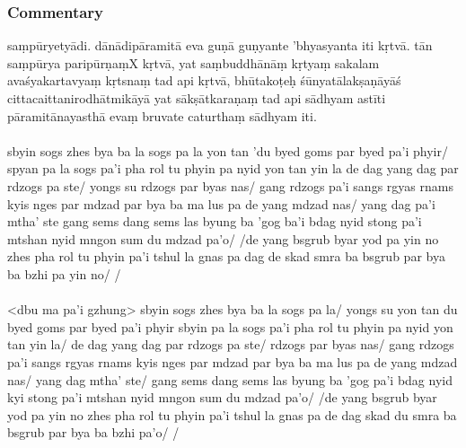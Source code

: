\documentclass[12pt]{article}
\begin{document}
\subsubsection{Commentary}
saṃpūryetyādi.
dānādipāramitā eva guṇā guṇyante 'bhyasyanta iti kṛtvā.
tān saṃpūrya paripūrṇaṃX kṛtvā, yat saṃbuddhānāṃ kṛtyaṃ sakalam\footnoteB{
	kṛtyaṃ sakalam] \conj ; sakalam \MS\ \EDD	
} avaśyakartavyaṃ kṛtsnaṃ tad api kṛtvā, bhūtakoṭeḥ śūnyatālakṣaṇāyāś cittacaitta\footnoteB{
	cittacaitta°] \EDD\ (\emd); cittacaitya° \MS
}\hspace{0em}nirodhātmikāyā yat sākṣātkaraṇaṃ tad api sādhyam astīti pāramitānayasthā evaṃ bruvate caturthaṃ sādhyam iti.\\

\textbf{\TVA}\\
sbyin sogs zhes bya ba la sogs pa la yon tan 'du byed goms par byed pa'i phyir/ spyan pa la sogs pa'i pha rol tu phyin pa nyid yon tan yin la de dag yang dag par rdzogs pa ste/ yongs su rdzogs par byas nas/ gang rdzogs pa'i sangs rgyas rnams kyis nges par mdzad par bya ba ma lus pa de yang mdzad nas/ yang dag pa'i mtha' ste gang sems dang sems las byung ba 'gog ba'i bdag nyid stong pa'i mtshan nyid mngon sum du mdzad pa'o/ /de yang bsgrub byar yod pa yin no zhes pha rol tu phyin pa'i tshul la gnas pa dag de skad smra ba bsgrub par bya ba bzhi pa yin no/ /\\

\textbf{\TVB}\\
<dbu ma pa'i gzhung> sbyin sogs zhes bya ba la sogs pa la/ yongs su yon tan du byed goms par byed pa'i phyir sbyin pa la sogs pa'i pha rol tu phyin pa nyid yon tan yin la/ de dag yang dag par rdzogs pa ste/ rdzogs par byas nas/ gang rdzogs pa'i sangs rgyas rnams kyis nges par mdzad par bya ba ma lus pa de yang mdzad nas/ yang dag mtha' ste/ gang sems dang sems las byung ba 'gog pa'i bdag nyid kyi stong pa'i mtshan nyid mngon sum du mdzad pa'o/ /de yang bsgrub byar yod pa yin no zhes pha rol tu phyin pa'i tshul la gnas pa de dag skad du smra ba bsgrub par bya ba bzhi pa'o/ /
\end{document}
